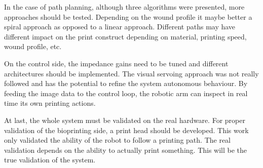In the case of path planning, although three algorithms were presented, more approaches should be tested. Depending on the wound profile it maybe better a spiral approach as opposed to a linear approach. Different paths may have different impact on the print construct depending on material, printing speed, wound profile, etc.

On the control side, the impedance gains need to be tuned and different architectures should be implemented. The visual servoing approach was not really followed and has the potential to refine the system autonomous behaviour. By feeding the image data to the control loop, the robotic arm can inspect in real time its own printing actions.

At last, the whole system must be validated on the real hardware. For proper validation of the bioprinting side, a print head should be developed. This work only validated the ability of the robot to follow a printing path. The real validation depends on the ability to actually print something. This will be the true validation of the system.

